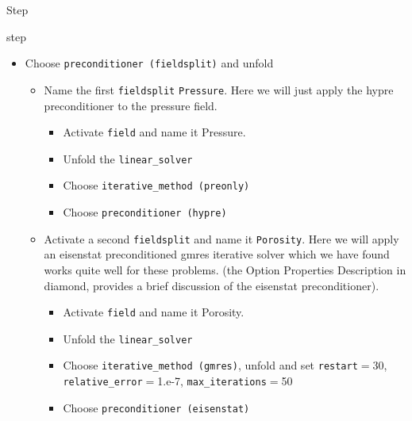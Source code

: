 \begin{steps}{Step}
\begin{steps}{step}
\begin{itemize}
    \item Choose \texttt{preconditioner (fieldsplit)} and unfold
      \begin{itemize}
      \item Name the first \texttt{fieldsplit} \texttt{Pressure}.
        Here we will just apply the hypre preconditioner to the
        pressure field.
        \begin{itemize}
        \item Activate \texttt{field} and name it
          Pressure.
        \item Unfold the \texttt{linear\_solver}
        \item Choose \texttt{iterative\_method (preonly)} 
        \item Choose \texttt{preconditioner (hypre)} 
        \end{itemize}
      \item Activate a second \texttt{fieldsplit} and name it
        \texttt{Porosity}.  Here we will apply an eisenstat
        preconditioned gmres iterative solver which we have found
        works quite well for these problems. (the Option Properties
        Description in diamond, provides a brief discussion of the eisenstat preconditioner).
        \begin{itemize}
        \item Activate \texttt{field} and name it
          Porosity.
        \item Unfold the \texttt{linear\_solver}
        \item Choose \texttt{iterative\_method (gmres)}, unfold and set
         \texttt{restart}$=$30, \texttt{relative\_error}$=$1.e-7, \texttt{max\_iterations}$=$50
        \item Choose \texttt{preconditioner (eisenstat)} 
        \end{itemize}
      \end{itemize}
    \end{itemize}
    

\end{steps}
\end{steps}
